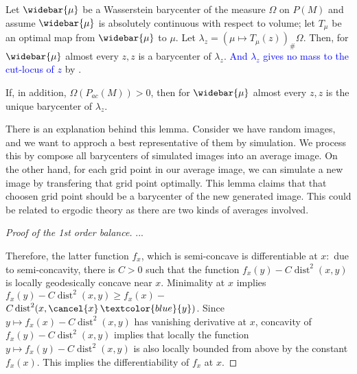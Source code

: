 \begin{lem} 
	\label{lem:inverse_barycenter}
	Let \( \widebar { \mu } \) be a Wasserstein barycenter of the measure \( \Omega \) on \( P ( M ) \) and assume \( \widebar { \mu } \) is absolutely continuous with respect to volume;
	let \( T _ { \mu } \) be an optimal map from \( \widebar { \mu } \) to \( \mu . \)
	Let \( \lambda _ { z } = \left( \mu \mapsto T _ { \mu } ( z ) \right) _ { \# } \Omega . \)
	Then, for \( \widebar { \mu } \) almost every \( z , z \) is a barycenter of \( \lambda _ { z }\).
	\textcolor{blue}{And $\lambda_z$ gives no mass to the cut-locus of $z$} by .

	If, in addition, \( \Omega \left( P _ { a c } ( M ) \right) > 0 \), then for \( \widebar { \mu } \) almost every \( z , z \) is the unique barycenter of $\lambda _ { z }$.

\end{lem}

There is an explanation behind this lemma. Consider we have random images, and we want to approch a best representative of them by simulation. We process this by compose all barycenters of simulated images into an average image. On the other hand, for each grid point in our average image, we can simulate a new image by transfering that grid point optimally. This lemma claims that that choosen grid point should be a barycenter of the new generated image. This could be related to ergodic theory as there are two kinds of averages involved.

\begin{proof}[Proof of the 1st order balance]
	...

	Therefore, the latter function \( f _ { x } \), which is semi-concave is differentiable at \( x : \) due to semi-concavity, there is \( C > 0 \) such that the function \( f _ { x } ( y ) - C \operatorname { dist } ^ { 2 } ( x , y ) \) is locally geodesically concave near \( x \).
	Minimality at \( x \) implies \( f _ { x } ( y ) - C \operatorname { dist } ^ { 2 } ( x , y ) \geq f _ { x } ( x ) - \) \( C \operatorname { dist } ^ { 2 } ( x , \cancel{x}\, \textcolor{blue}{y} ) \).
	Since \( y \mapsto f _ { x } ( x ) - C \operatorname { dist } ^ { 2 } ( x , y ) \) has vanishing derivative at \( x \), concavity of \( f _ { x } ( y ) - C \operatorname { dist } ^ { 2 } ( x , y ) \) implies that locally the function \( y \mapsto f _ { x } ( y ) - C \operatorname { dist } ^ { 2 } ( x , y ) \) is also
	locally bounded from above by the constant \( f _ { x } ( x ) . \) This implies the differentiability of
	\( f _ { x } \) at \( x \).
\end{proof}

